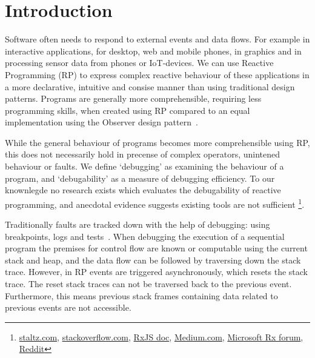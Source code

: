 



\section{Introduction}%
\label{sec:intro} Software often needs to respond to external events and
data flows.  For example in interactive applications, for desktop, web
and mobile phones, in graphics and in processing sensor data from phones
or IoT-devices.  We can use Reactive Programming (RP) to express complex
reactive behaviour of these applications in a more declarative,
intuitive and consise manner than using traditional design patterns.
Programs are generally more comprehensible, requiring less programming
skills, when created using RP compared to an equal implementation using
the Observer design pattern~\cite{johnson1995design,
salvaneschi2014empirical}.

While the general behaviour of programs becomes more comprehensible
using RP, this does not necessarily hold in precense of complex
operators, unintened behaviour or faults.  We define `debugging' as
examining the behaviour of a program, and `debugability' as a measure of
debugging efficiency.  To our knownlegde no research exists which
evaluates the debugability of reactive programming, and anecdotal
evidence suggests existing tools are not sufficient%
\footnote{
\href{http://staltz.com/how-to-debug-rxjs-code.html}{staltz.com},
\href{http://stackoverflow.com/questions/38590346/how-to-debug-rxjs5}{stackoverflow.com},
\href{https://github.com/Reactive-Extensions/RxJS/blob/master/doc/gettingstarted/testing.md\#debugging-your-rx-application}{RxJS doc},
\href{https://medium.com/@BrianDiPalma/thoughts-on-rxjs-cf3562e20d74\#.ebdrmmeym}{Medium.com},
\href{https://social.msdn.microsoft.com/Forums/en-US/a0215434-8ad6-45e1-9f21-ed2f14d7317a/a-simple-trace-method\?forum=rx}{Microsoft Rx forum},
\href{https://www.reddit.com/r/javascript/comments/4austh/why_isnt_rxjs_more_popular_are_there_bad_parts}{Reddit}
}.

Traditionally faults are tracked down with the help of debugging:  using
breakpoints, logs and tests~\cite{zeller2009programs}.  When debugging
the execution of a sequential program the premises for control flow are
known or computable using the current stack and heap, and the data flow
can be followed by traversing down the stack trace.  However, in RP
events are triggered asynchronously, which resets the stack trace.  The
reset stack traces can not be traversed back to the previous event.
Furthermore, this means previous stack frames containing data related to
previous events are not accessible.

